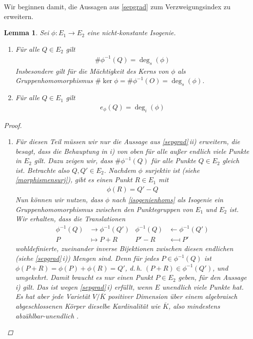 \documentclass[english, german, parskip=half]{scrartcl}
\newtheorem{Lemma}[Satz]{Lemma}
\theoremstyle{definition}
\theoremstyle{remark}
\newcommand*{\algK}{\ensuremath{\overline K}} %
\newcommand*{\longto}{\longrightarrow}
\newcommand*{\longfrom}{\longleftarrow}
\newcommand*{\degs}{\operatorname{\deg}_s} %
\newcommand*{\degi}{\operatorname{\deg}_i} %
\renewcommand{\O}{O}
\begin{document}
Wir beginnen damit, die Aussagen aus \autoref{sepgrad} zum
Verzweigungsindex zu erweitern.
\begin{Lemma}\label{sepgrad2}
  Sei $\phi\colon E_1\to E_2$ eine nicht-konstante Isogenie.
  \begin{enumerate}[label=\roman*)]
  \item Für alle $Q\in E_2$ gilt
    \begin{gather*}
      \#\phi^{-1}(Q) = \degs(\phi)
    \end{gather*}
    Insbesondere gilt für die Mächtigkeit des Kerns von $\phi$ als
    Gruppenhomomorphismus 
    $\#\ker\phi=\#\phi^{-1}(\O)=\degs(\phi)$.
  \item Für alle $Q\in E_1$ gilt
    \begin{gather*}
      e_{\phi}(Q) = \degi(\phi)
    \end{gather*}
  \end{enumerate}
  \begin{proof}~
    \begin{enumerate}[label=\roman*)]
    \item Für diesen Teil müssen wir nur die Aussage aus
      \autoref{sepgrad}\,ii) erweitern, die besagt, dass die Behauptung
      in \emph{i)} von oben für alle außer endlich viele Punkte in $E_2$
      gilt. Dazu zeigen wir, dass $\#\phi^{-1}(Q)$ für alle Punkte $Q\in
      E_2$ gleich ist. 
      Betrachte also $Q,Q'\in E_2$. Nachdem $\phi$ surjektiv ist
      (siehe \autoref{morphismensurj}), gibt es einen Punkt $R\in E_1$ mit
      \begin{gather*}
        \phi(R) = Q' - Q
      \end{gather*}
      Nun können wir nutzen, dass $\phi$  nach \autoref{isogenienhoms} als
      Isogenie ein Gruppenhomomorphismus zwischen den Punktegruppen von
      $E_1$ und $E_2$ ist. Wir erhalten, dass die Translationen
      \begin{align*}
        \phi^{-1}(Q) &\longto \phi^{-1}(Q')
        &\phi^{-1}(Q) &\longfrom \phi^{-1}(Q')\\
        P &\longmapsto P+R
        &P'-R &\longmapsfrom P'
      \end{align*}
      wohldefinierte, zueinander inverse Bijektionen zwischen diesen
      endlichen (siehe \autoref{sepgrad}\,\emph{i)}) Mengen sind.
      Denn für jedes $P\in\phi^{-1}(Q)$ ist
      $\phi(P+R)=\phi(P)+\phi(R)=Q'$, d.\,h. $(P+R)\in\phi^{-1}(Q')$,
      und umgekehrt.
      Damit braucht es nur einen Punkt $P\in E_2$ geben, für den Aussage
      \emph{i)} gilt. Das ist wegen \autoref{sepgrad}\,\emph{i)} erfüllt,
      wenn $E$ unendlich viele Punkte hat.
      Es hat aber jede Varietät $V/\algK$ positiver Dimension
      über einem algebraisch abgeschlossenen Körper dieselbe
      Kardinalität wie $\algK$, also mindestens abzählbar-unendlich
      \cite[siehe][Exercise I.4.8 oder Section I.6]{hartshorne}.
      

\end{enumerate}
\end{proof}
\end{Lemma}
\end{document}
